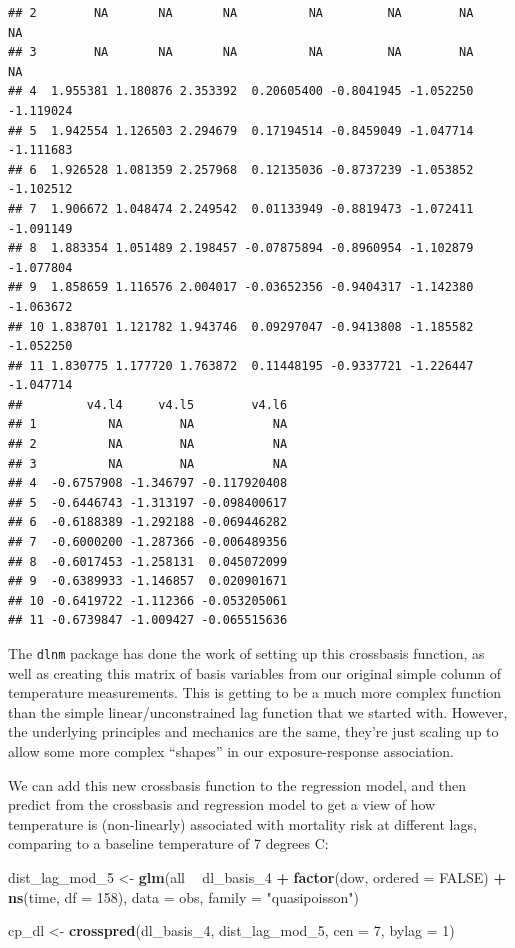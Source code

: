\documentclass[
]{book}
\newenvironment{Shaded}{\begin{snugshade}}{\end{snugshade}}
\newcommand{\DataTypeTok}[1]{\textcolor[rgb]{0.13,0.29,0.53}{#1}}
\newcommand{\DecValTok}[1]{\textcolor[rgb]{0.00,0.00,0.81}{#1}}
\newcommand{\KeywordTok}[1]{\textcolor[rgb]{0.13,0.29,0.53}{\textbf{#1}}}
\newcommand{\NormalTok}[1]{#1}
\newcommand{\OperatorTok}[1]{\textcolor[rgb]{0.81,0.36,0.00}{\textbf{#1}}}
\newcommand{\OtherTok}[1]{\textcolor[rgb]{0.56,0.35,0.01}{#1}}
\newcommand{\StringTok}[1]{\textcolor[rgb]{0.31,0.60,0.02}{#1}}
\begin{document}
\begin{verbatim}
## 2        NA       NA       NA          NA         NA        NA        NA
## 3        NA       NA       NA          NA         NA        NA        NA
## 4  1.955381 1.180876 2.353392  0.20605400 -0.8041945 -1.052250 -1.119024
## 5  1.942554 1.126503 2.294679  0.17194514 -0.8459049 -1.047714 -1.111683
## 6  1.926528 1.081359 2.257968  0.12135036 -0.8737239 -1.053852 -1.102512
## 7  1.906672 1.048474 2.249542  0.01133949 -0.8819473 -1.072411 -1.091149
## 8  1.883354 1.051489 2.198457 -0.07875894 -0.8960954 -1.102879 -1.077804
## 9  1.858659 1.116576 2.004017 -0.03652356 -0.9404317 -1.142380 -1.063672
## 10 1.838701 1.121782 1.943746  0.09297047 -0.9413808 -1.185582 -1.052250
## 11 1.830775 1.177720 1.763872  0.11448195 -0.9337721 -1.226447 -1.047714
##         v4.l4     v4.l5        v4.l6
## 1          NA        NA           NA
## 2          NA        NA           NA
## 3          NA        NA           NA
## 4  -0.6757908 -1.346797 -0.117920408
## 5  -0.6446743 -1.313197 -0.098400617
## 6  -0.6188389 -1.292188 -0.069446282
## 7  -0.6000200 -1.287366 -0.006489356
## 8  -0.6017453 -1.258131  0.045072099
## 9  -0.6389933 -1.146857  0.020901671
## 10 -0.6419722 -1.112366 -0.053205061
## 11 -0.6739847 -1.009427 -0.065515636
\end{verbatim}

The \texttt{dlnm} package has done
the work of setting up this crossbasis function, as well as creating this matrix of
basis variables from our original simple column of temperature measurements. This
is getting to be a much more complex function than the simple linear/unconstrained lag
function that we started with. However, the underlying principles and mechanics are the
same, they're just scaling up to allow some more complex ``shapes'' in our exposure-response
association.

We can add this new crossbasis function to the regression model, and then predict from
the crossbasis and regression model to get a view of how temperature is (non-linearly) associated
with mortality risk at different lags, comparing to a baseline temperature of 7 degrees C:

\begin{Shaded}
\begin{Highlighting}[]
\NormalTok{dist_lag_mod_}\DecValTok{5}\NormalTok{ <-}\StringTok{ }\KeywordTok{glm}\NormalTok{(all }\OperatorTok{~}\StringTok{ }\NormalTok{dl_basis_}\DecValTok{4} \OperatorTok{+}\StringTok{ }
\StringTok{                        }\KeywordTok{factor}\NormalTok{(dow, }\DataTypeTok{ordered =} \OtherTok{FALSE}\NormalTok{) }\OperatorTok{+}
\StringTok{                          }\KeywordTok{ns}\NormalTok{(time, }\DataTypeTok{df =} \DecValTok{158}\NormalTok{), }
                        \DataTypeTok{data =}\NormalTok{ obs, }\DataTypeTok{family =} \StringTok{"quasipoisson"}\NormalTok{)}

\NormalTok{cp_dl <-}\StringTok{ }\KeywordTok{crosspred}\NormalTok{(dl_basis_}\DecValTok{4}\NormalTok{, dist_lag_mod_}\DecValTok{5}\NormalTok{, }\DataTypeTok{cen =} \DecValTok{7}\NormalTok{, }\DataTypeTok{bylag =} \DecValTok{1}\NormalTok{)}
\end{Highlighting}
\end{Shaded}
\end{document}
